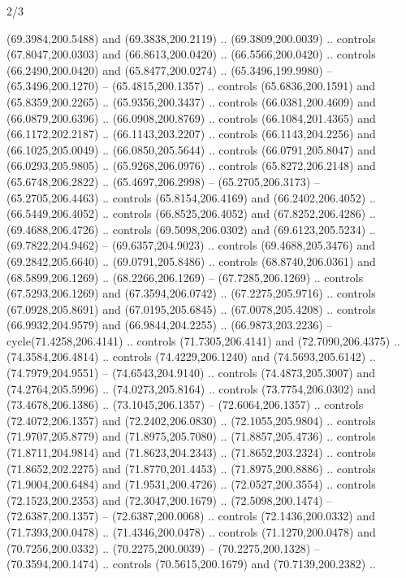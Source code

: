\begin{flagdescription}{2/3}
\begin{scope}[yshift=\flagwidth,scale=\flagwidth/1241.93737]
\begin{scope}[y=-1mm, x=1mm,draw=gold,fill=blue,line join=miter,miter limit=4,line width=1.8\lw]
\begin{scope}[shift={(78,80)}]
  (69.3984,200.5488) and (69.3838,200.2119) .. (69.3809,200.0039) .. controls
  (67.8047,200.0303) and (66.8613,200.0420) .. (66.5566,200.0420) .. controls
  (66.2490,200.0420) and (65.8477,200.0274) .. (65.3496,199.9980) --
  (65.3496,200.1270) -- (65.4815,200.1357) .. controls (65.6836,200.1591) and
  (65.8359,200.2265) .. (65.9356,200.3437) .. controls (66.0381,200.4609) and
  (66.0879,200.6396) .. (66.0908,200.8769) .. controls (66.1084,201.4365) and
  (66.1172,202.2187) .. (66.1143,203.2207) .. controls (66.1143,204.2256) and
  (66.1025,205.0049) .. (66.0850,205.5644) .. controls (66.0791,205.8047) and
  (66.0293,205.9805) .. (65.9268,206.0976) .. controls (65.8272,206.2148) and
  (65.6748,206.2822) .. (65.4697,206.2998) -- (65.2705,206.3173) --
  (65.2705,206.4463) .. controls (65.8154,206.4169) and (66.2402,206.4052) ..
  (66.5449,206.4052) .. controls (66.8525,206.4052) and (67.8252,206.4286) ..
  (69.4688,206.4726) .. controls (69.5098,206.0302) and (69.6123,205.5234) ..
  (69.7822,204.9462) -- (69.6357,204.9023) .. controls (69.4688,205.3476) and
  (69.2842,205.6640) .. (69.0791,205.8486) .. controls (68.8740,206.0361) and
  (68.5899,206.1269) .. (68.2266,206.1269) -- (67.7285,206.1269) .. controls
  (67.5293,206.1269) and (67.3594,206.0742) .. (67.2275,205.9716) .. controls
  (67.0928,205.8691) and (67.0195,205.6845) .. (67.0078,205.4208) .. controls
  (66.9932,204.9579) and (66.9844,204.2255) .. (66.9873,203.2236) --
  cycle(71.4258,206.4141) .. controls (71.7305,206.4141) and (72.7090,206.4375)
  .. (74.3584,206.4814) .. controls (74.4229,206.1240) and (74.5693,205.6142) ..
  (74.7979,204.9551) -- (74.6543,204.9140) .. controls (74.4873,205.3007) and
  (74.2764,205.5996) .. (74.0273,205.8164) .. controls (73.7754,206.0302) and
  (73.4678,206.1386) .. (73.1045,206.1357) -- (72.6064,206.1357) .. controls
  (72.4072,206.1357) and (72.2402,206.0830) .. (72.1055,205.9804) .. controls
  (71.9707,205.8779) and (71.8975,205.7080) .. (71.8857,205.4736) .. controls
  (71.8711,204.9814) and (71.8623,204.2343) .. (71.8652,203.2324) .. controls
  (71.8652,202.2275) and (71.8770,201.4453) .. (71.8975,200.8886) .. controls
  (71.9004,200.6484) and (71.9531,200.4726) .. (72.0527,200.3554) .. controls
  (72.1523,200.2353) and (72.3047,200.1679) .. (72.5098,200.1474) --
  (72.6387,200.1357) -- (72.6387,200.0068) .. controls (72.1436,200.0332) and
  (71.7393,200.0478) .. (71.4346,200.0478) .. controls (71.1270,200.0478) and
  (70.7256,200.0332) .. (70.2275,200.0039) -- (70.2275,200.1328) --
  (70.3594,200.1474) .. controls (70.5615,200.1679) and (70.7139,200.2382) ..

\end{scope}
\end{scope}
\end{scope}
\end{flagdescription}
